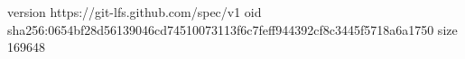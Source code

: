 version https://git-lfs.github.com/spec/v1
oid sha256:0654bf28d56139046cd74510073113f6c7feff944392cf8c3445f5718a6a1750
size 169648

